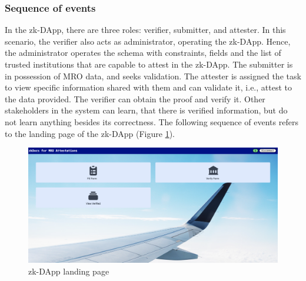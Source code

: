 \subsubsection{Sequence of events}
In the zk-DApp, there are three roles: verifier, submitter, and attester. In this scenario, the verifier also acts as administrator, operating the zk-DApp. Hence, the administrator operates the schema with constraints, fields and the list of trusted institutions that are capable to attest in the zk-DApp. The submitter is in possession of MRO data, and seeks validation. The attester is assigned the task to view specific information shared with them and can validate it, i.e., attest to the data provided. The verifier can obtain the proof and verify it. Other stakeholders in the system can learn, that there is verified information, but do not learn anything besides its correctness. The following sequence of events refers to the landing page of the zk-DApp (Figure \ref{fig:landing-page}).
\begin{figure}[hbt]
	\centering
		\includegraphics[width=1.0\textwidth]{Pictures/landingpage.png}
	\caption{zk-DApp landing page}
	\label{fig:landing-page}
\end{figure}
